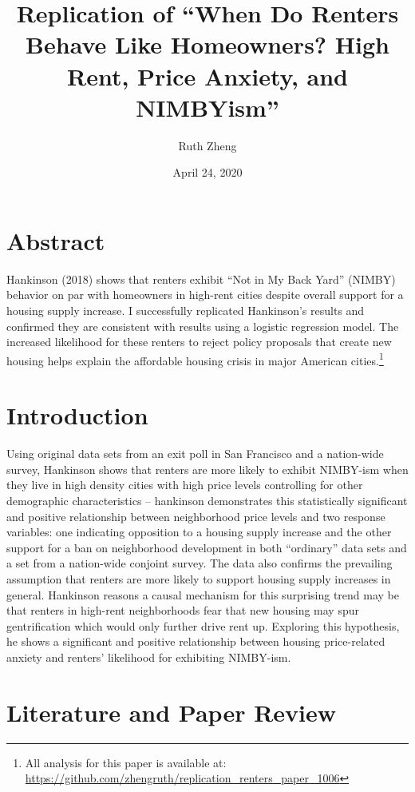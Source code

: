 \documentclass[]{article}
\title{Replication of ``When Do Renters Behave Like Homeowners? High Rent, Price Anxiety, and NIMBYism''}
\author{Ruth Zheng}
\date{April 24, 2020}
\begin{document}
\maketitle

\hypertarget{abstract}{%
\section{Abstract}\label{abstract}}

Hankinson (2018) shows that renters exhibit ``Not in My Back Yard'' (NIMBY) behavior on par with homeowners in high-rent cities despite overall support for a housing supply increase. I successfully replicated Hankinson's results and confirmed they are consistent with results using a logistic regression model. The increased likelihood for these renters to reject policy proposals that create new housing helps explain the affordable housing crisis in major American cities.\footnote{All analysis for this paper is available at: \url{https://github.com/zhengruth/replication_renters_paper_1006}}

\hypertarget{introduction}{%
\section{Introduction}\label{introduction}}

Using original data sets from an exit poll in San Francisco and a nation-wide survey, Hankinson shows that renters are more likely to exhibit NIMBY-ism when they live in high density cities with high price levels controlling for other demographic characteristics -- hankinson demonstrates this statistically significant and positive relationship between neighborhood price levels and two response variables: one indicating opposition to a housing supply increase and the other support for a ban on neighborhood development in both ``ordinary'' data sets and a set from a nation-wide conjoint survey. The data also confirms the prevailing assumption that renters are more likely to support housing supply increases in general. Hankinson reasons a causal mechanism for this surprising trend may be that renters in high-rent neighborhoods fear that new housing may spur gentrification which would only further drive rent up. Exploring this hypothesis, he shows a significant and positive relationship between housing price-related anxiety and renters' likelihood for exhibiting NIMBY-ism.

\hypertarget{literature-and-paper-review}{%
\section{Literature and Paper Review}\label{literature-and-paper-review}}
\end{document}
